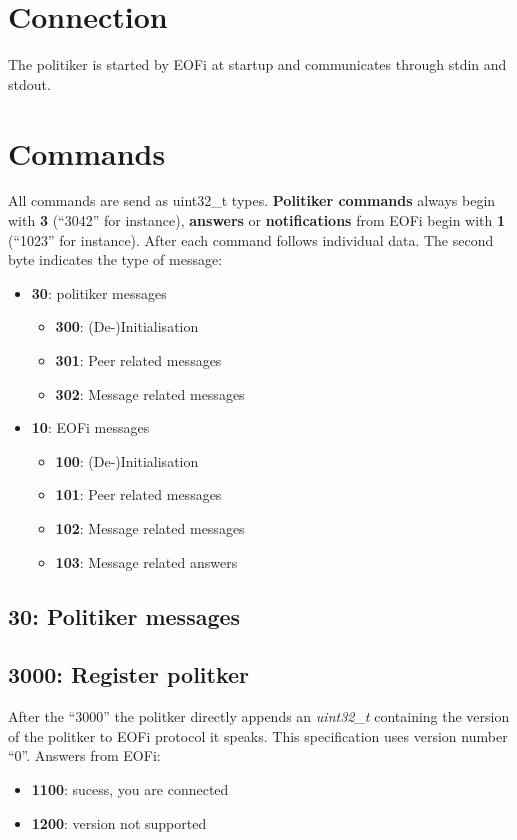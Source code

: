 \documentclass[12pt,a4paper]{book}
\begin{document}
\section{Connection}
The politiker is started by EOFi at startup and communicates through stdin
and stdout.
\section{Commands}
All commands are send as uint32\_t types.
\textbf{Politiker commands} always begin with
\textbf{3} ("`3042"' for instance),
\textbf{answers} or \textbf{notifications} from
EOFi begin with \textbf{1} ("`1023"' for instance).
After each command follows individual data. The second byte indicates the type of message:
\begin{itemize}
\item \textbf{30}: politiker messages
\begin{itemize}
\item \textbf{300}: (De-)Initialisation
\item \textbf{301}: Peer related messages
\item \textbf{302}: Message related messages
\end{itemize}
\item \textbf{10}: EOFi messages
\begin{itemize}
\item \textbf{100}: (De-)Initialisation
\item \textbf{101}: Peer related messages
\item \textbf{102}: Message related messages
\item \textbf{103}: Message related answers
\end{itemize}
\end{itemize}

\subsection{30: Politiker messages}
\subsection{3000: Register politker}
After the "`3000"' the politker directly appends an
\textit{uint32\_t} containing the version of the politker to EOFi protocol
it speaks. This specification uses version number "`0"'.
Answers from EOFi:
\begin{itemize}
\item \textbf{1100}: sucess, you are connected
\item \textbf{1200}: version not supported
\end{itemize}
\end{document}
